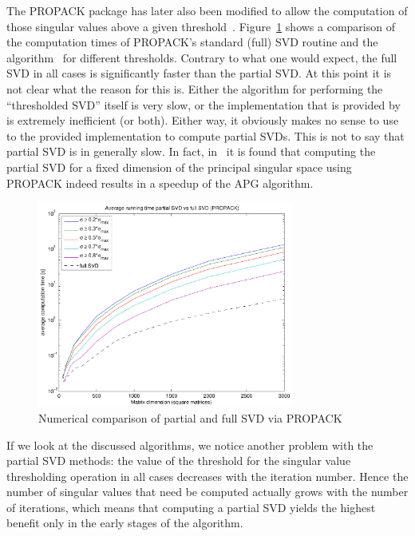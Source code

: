 \documentclass{../../common/projectreport}
\begin{document}
The PROPACK package has later also been modified to allow the computation of those singular values above a given threshold~\cite{Lin:2011kx}. Figure~\ref{Algorithms:Discussion:SVD:lasvdThrVSlasvd:figure} shows a comparison of the computation times of PROPACK's standard (full) SVD routine and the algorithm~\cite{Lin:2011kx} for different thresholds. Contrary to what one would expect, the full SVD in all cases is significantly faster than the partial SVD. At this point it is not clear what the reason for this is. Either the algorithm for performing the ``thresholded SVD'' itself is very slow, or the implementation that is provided by~\cite{Lin:2011kx} is extremely inefficient (or both). Either way, it obviously makes no sense to use to the provided implementation to compute partial SVDs. This is not to say that partial SVD is in generally slow. In fact, in~\cite{Lin:2010fk} it is found that computing the partial SVD for a fixed dimension of the principal singular space using PROPACK indeed results in a speedup of the APG algorithm. 
%
\begin{figure}[htbp]
\centering
\includegraphics[width=0.75\textwidth]{../figures/thresh_svd_comparison}
\caption{Numerical comparison of partial and full SVD via PROPACK}
\label{Algorithms:Discussion:SVD:lasvdThrVSlasvd:figure}
\end{figure}

If we look at the discussed algorithms, we notice another problem with the partial SVD methods: the value of the threshold for the singular value thresholding operation in all cases decreases with the iteration number. Hence the number of singular values that need be computed actually grows with the number of iterations, which means that computing a partial SVD yields the highest benefit only in the early stages of the algorithm. 
\end{document}
